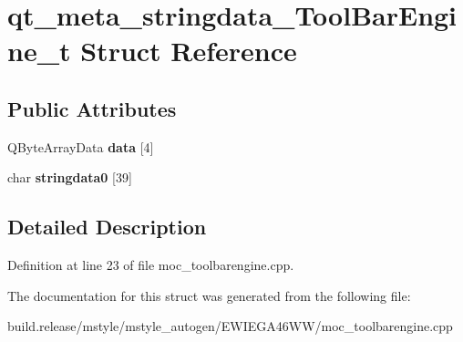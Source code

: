 \hypertarget{structqt__meta__stringdata___tool_bar_engine__t}{}\section{qt\+\_\+meta\+\_\+stringdata\+\_\+\+Tool\+Bar\+Engine\+\_\+t Struct Reference}
\label{structqt__meta__stringdata___tool_bar_engine__t}
\subsection*{Public Attributes}
\begin{DoxyCompactItemize}
\item 
\mbox{\label{structqt__meta__stringdata___tool_bar_engine__t_a03d51ead7c686873c0785fec3ada3c2c}} 
Q\+Byte\+Array\+Data {\bfseries data} \mbox{[}4\mbox{]}
\item 
\mbox{\label{structqt__meta__stringdata___tool_bar_engine__t_a9c183509df6e6803c16b54d8f4c524d5}} 
char {\bfseries stringdata0} \mbox{[}39\mbox{]}
\end{DoxyCompactItemize}


\subsection{Detailed Description}


Definition at line 23 of file moc\+\_\+toolbarengine.\+cpp.



The documentation for this struct was generated from the following file\+:\begin{DoxyCompactItemize}
\item 
build.\+release/mstyle/mstyle\+\_\+autogen/\+E\+W\+I\+E\+G\+A46\+W\+W/moc\+\_\+toolbarengine.\+cpp\end{DoxyCompactItemize}
